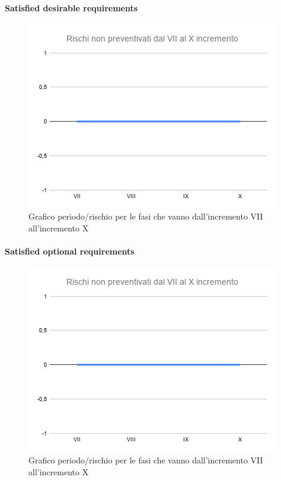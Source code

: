 \paragraph{Satisfied desirable requirements}
	\begin{figure}[H]
			\centering%
			\includegraphics[width=0.8\linewidth]{./res/images/RischiNonPreven_4.png}
			\caption{Grafico periodo/rischio per le fasi che vanno dall'incremento VII all'incremento X}
			\label{fig:Grafico periodo/rischio per le fasi che vanno dall'incremento VII all'incremento X}
	\end{figure}
\paragraph{Satisfied optional requirements}
	\begin{figure}[H]
			\centering%
			\includegraphics[width=0.8\linewidth]{./res/images/RischiNonPreven_4.png}
			\caption{Grafico periodo/rischio per le fasi che vanno dall'incremento VII all'incremento X}
			\label{fig:Grafico periodo/rischio per le fasi che vanno dall'incremento VII all'incremento X}
	\end{figure}
